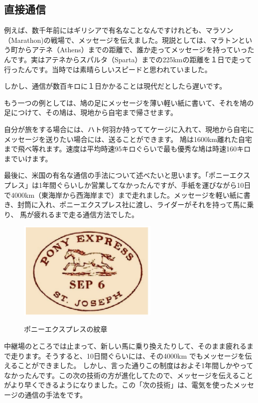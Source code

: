 \subsection{直接通信}
例えば、数千年前にはギリシアで有名なことなんですけれども、マラソン（Marathon)の戦場で、メッセージを伝えました。現説としては、マラトンという町からアテネ（Athens）までの距離で、誰か走ってメッセージを持っていったんです。実はアテネからスパルタ（Sparta）までの225kmの距離を１日で走って行ったんです。当時では素晴らしいスピードと思われていました。

しかし、通信が数百キロに１日かかることは現代だとしたら遅いです。

もう一つの例としては、鳩の足にメッセージを薄い軽い紙に書いて、それを鳩の足につけて、その鳩は、現地から自宅まで帰させます。

自分が旅をする場合には、ハト何羽か持っててケージに入れて、現地から自宅にメッセージを送りたい場合には、送ることができます。
鳩は1600km離れた自宅まで飛べ等れます。速度は平均時速95キロぐらいで最も優秀な鳩は時速160キロまでいけます。

最後に、米国の有名な通信の手法について述べたいと思います。「ポニーエクスプレス」は1年間ぐらいしか営業してなかったんですが、手紙を運びながら10日で4000km（東海岸から西海岸まで）まで走れました。メッセージを軽い紙に書き、封筒に入れ、ポニーエクスプレス社に渡し、ライダーがそれを持って馬に乗り、
馬が疲れるまで走る通信方法でした。
\begin{figure}[H]
    \centering
    \includegraphics[width=0.6\textwidth]{lesson1/ponyexpress.eps}
    \label{図: 1}
    \caption{ポニーエクスプレスの紋章}
\end{figure}

中継場のところでは止まって、新しい馬に乗り換えたりして、そのまま疲れるまで走ります。そうすると、10日間ぐらいには、その4000km でもメッセージを伝えることができました。
しかし、言った通りこの制度はおよそ1年間しかやってなかったんです。この次の技術の方が進化してたので、メッセージを伝えることがより早くできるようになりました。この「次の技術」は、電気を使ったメッセージの通信の手法をです。

